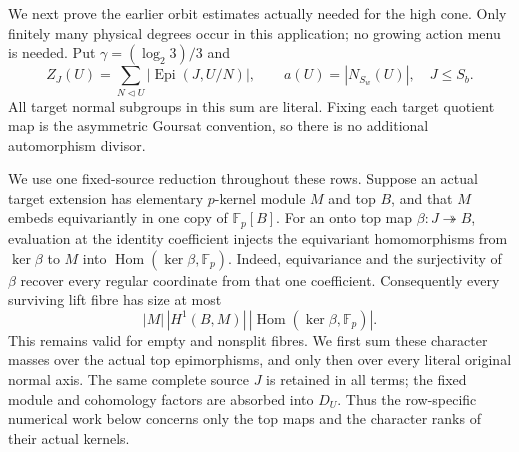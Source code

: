We next prove the earlier orbit estimates actually needed for the high
cone. Only finitely many physical degrees occur in this application;
no growing action menu is needed. Put $\gamma=(\log_2 3)/3$ and
\[
 Z_J(U)=\sum_{N\lhd U}|\operatorname{Epi}(J,U/N)|,
 \qquad a(U)=|N_{S_w}(U)|,\quad J\leq S_b.
\]
All target normal subgroups in this sum are literal. Fixing each target
quotient map is the asymmetric Goursat convention, so there is no
additional automorphism divisor.

We use one fixed-source reduction throughout these rows.  Suppose an actual
target extension has elementary $p$-kernel module $M$ and top $B$, and that
$M$ embeds equivariantly in one copy of $\mathbb F_p[B]$.  For an onto top map
$\beta:J\twoheadrightarrow B$, evaluation at the identity coefficient injects
the equivariant homomorphisms from $\ker\beta$ to $M$ into
$\operatorname{Hom}(\ker\beta,\mathbb F_p)$.  Indeed, equivariance and the
surjectivity of $\beta$ recover every regular coordinate from that one
coefficient.  Consequently every surviving lift fibre has size at most
\[
 |M|\,|H^1(B,M)|\,
 |\operatorname{Hom}(\ker\beta,\mathbb F_p)|.
\]
This remains valid for empty and nonsplit fibres.  We first sum these character
masses over the actual top epimorphisms, and only then over every literal
original normal axis.  The same complete source $J$ is retained in all terms;
the fixed module and cohomology factors are absorbed into $D_U$.  Thus the
row-specific numerical work below concerns only the top maps and the character
ranks of their actual kernels.

